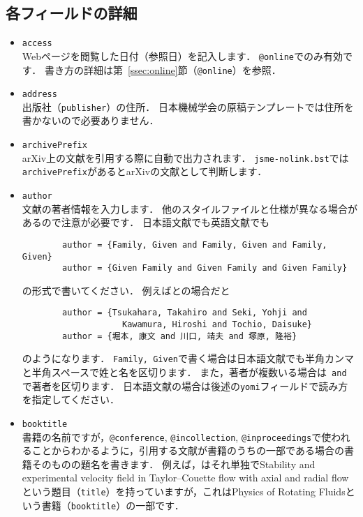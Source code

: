 \documentclass[a4paper,fleqn,uplatex,dvipdfmx]{jsarticle}
\makeatletter
\newcommand{\jsmefile}{\texttt{jsme-nolink.bst}}
\newcommand{\ttconference}{\texttt{@conference}}
\newcommand{\ttincollection}{\texttt{@incollection}}
\newcommand{\ttinproceedings}{\texttt{@inproceedings}}
\newcommand{\ttonline}{\texttt{@online}}
\makeatother
\begin{document}
\subsection{各フィールドの詳細}
\label{ssec:field}
\begin{itemize}
    \item \verb|access| \\
        Webページを閲覧した日付（参照日）を記入します．
        \ttonline でのみ有効です．
        書き方の詳細は第~\ref{ssec:online}節（\ttonline ）を参照．
    \item \verb|address| \\
        出版社（\verb|publisher|）の住所．
        日本機械学会の原稿テンプレートでは住所を書かないので必要ありません．
    \item \verb|archivePrefix| \\
        arXiv上の文献を引用する際に自動で出力されます．
        \jsmefile では\verb|archivePrefix|があるとarXivの文献として判断します．
    \item \verb|author| \\
        文献の著者情報を入力します．
        他の\BibTeX{}スタイルファイルと仕様が異なる場合があるので注意が必要です．
        日本語文献でも英語文献でも
        \begin{verbatim}
        author = {Family, Given and Family, Given and Family, Given}
        author = {Given Family and Given Family and Given Family}
        \end{verbatim}
        の形式で書いてください．
        例えば\citet{Tsukahara:TSFP2005}と\citet{堀本:可視化情報2020}の場合だと
        \begin{verbatim}
        author = {Tsukahara, Takahiro and Seki, Yohji and 
                    Kawamura, Hiroshi and Tochio, Daisuke}
        author = {堀本, 康文 and 川口, 靖夫 and 塚原, 隆裕}
        \end{verbatim}
        のようになります．
        \verb|Family, Given|で書く場合は日本語文献でも半角カンマと半角スペースで姓と名を区切ります．
        また，著者が複数いる場合は\verb| and |で著者を区切ります．
        日本語文献の場合は後述の\verb|yomi|フィールドで読み方を指定してください．
    \item \verb|booktitle| \\
        書籍の名前ですが，\ttconference, \ttincollection, \ttinproceedings で使われることからわかるように，引用する文献が書籍のうちの一部である場合の書籍そのものの題名を書きます．
        例えば，\citet{Lueptow:Springer2000}はそれ単独でStability and experimental velocity field in Taylor--Couette flow with axial and radial flowという題目（\verb|title|）を持っていますが，これはPhysics of Rotating Fluidsという書籍（\verb|booktitle|）の一部です．

\end{itemize}
\end{document}
